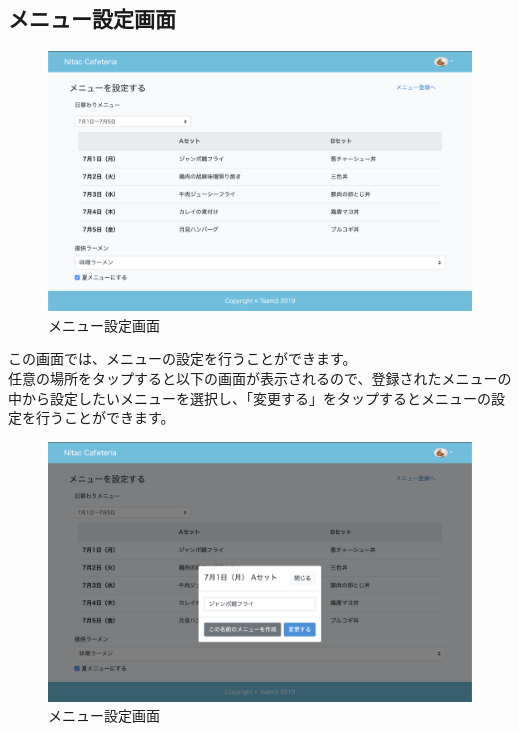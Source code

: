 \documentclass[a4paper]{jsarticle}
\begin{document}
\subsection{メニュー設定画面}
\begin{figure}[htbp]
\centering
\includegraphics[scale = 0.225]{image/set_menu.png}
\caption{メニュー設定画面}
\end{figure}
この画面では、メニューの設定を行うことができます。\\
任意の場所をタップすると以下の画面が表示されるので、登録されたメニューの中から設定したいメニューを選択し、「変更する」をタップするとメニューの設定を行うことができます。
\begin{figure}[htbp]
\centering
\includegraphics[scale = 0.225]{image/set_menu2.png}
\caption{メニュー設定画面}
\end{figure}
\newpage
\end{document}
